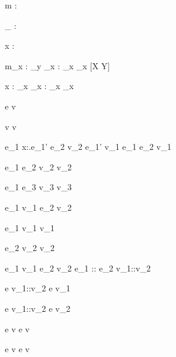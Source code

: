 
  {\infers m : \tau \To \Delta}


  { }
  {\infers \_ : \tau \To \nothing}

  { }
  {\infers x : \tau \To {}}

  { \Quad
   \infers m_x : \tau_y \To \Delta_x}
  {\infers {} :  \To \bigcup_x \Delta_x}
  [X \subseteq Y]

  { \Quad
   \infers x : \tau_x \To \Delta_x}
  {\infers {} :  \To \bigcup_x \Delta_x}




  {e  \eval v}


  {}
  {v  \eval v}

  {e_1 \eval \lambda x:\tau.e_1' \Quad
   e_2 \eval v_2 \Quad
   [x \mapsto v_2]e_1' \eval v_1}
  {e_1 e_2 \eval v_1}


  {e_1 \eval \True \Quad
   e_2 \eval v_2}
  { \eval v_2}

  {e_1 \eval \False \Quad
   e_3 \eval v_3}
  { \eval v_3}


  {e_1 \eval v_1 \Quad
   e_2 \eval v_2}
  { \eval {}}

  {e_1 \eval v_1}
  {\Fst {} \eval v_1}

  {e_2 \eval v_2}
  {\Snd {} \eval v_2 }


  {e_1 \eval v_1 \Quad
   e_2 \eval v_2}
  {e_1 :: e_2 \eval v_1::v_2}

  {e \eval v_1::v_2}
  {\Head e \eval v_1}

{e \eval v_1::v_2}
{\Tail e \eval v_2}



  {e \eval v}
  {\Done e \eval \Done v}

  {}
  {\Enter \beta \eval \Enter \beta}

  {e \eval v}
  {\Update e \eval \Update v}

